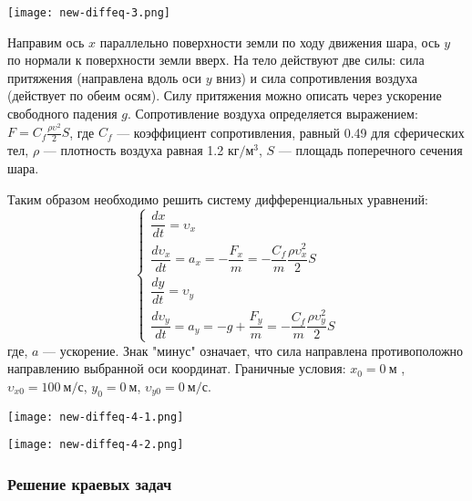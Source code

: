 \begin{center}
	\texttt{[image: new-diffeq-3.png]}
\end{center}



Направим ось $x$ параллельно поверхности земли по ходу движения шара, ось $y$ по нормали к поверхности земли вверх. На тело действуют две силы: сила притяжения (направлена вдоль оси $y$ вниз) и сила сопротивления воздуха (действует по обеим осям). Силу притяжения можно описать через ускорение свободного падения $g$. Сопротивление воздуха определяется выражением: $F=C_f \frac{\rho \upsilon^2}{2} S$, где $C_f$ --- коэффициент сопротивления, равный 0.49 для сферических тел, $\rho$ --- плотность воздуха равная 1.2 $кг/м^3$, $S$ --- площадь поперечного сечения шара.

Таким образом необходимо решить систему дифференциальных уравнений:
\begin{equation*}
\begin{cases}
\dfrac{dx}{dt}=\upsilon_x  \\
\dfrac{d \upsilon_x}{dt} = a_x = -\dfrac{F_x}{m}=-\dfrac{C_f}{m} \dfrac{\rho \upsilon_x^2}{2}S \\
\dfrac{dy}{dt}=\upsilon_y  \\
\dfrac{d \upsilon_y}{dt} = a_y = -g+\dfrac{F_y}{m}=-\dfrac{C_f}{m} \dfrac{\rho \upsilon_y^2}{2}S
\end{cases}
\end{equation*}
где, $a$ --- ускорение. Знак "минус" означает, что сила направлена противоположно направлению выбранной оси координат. Граничные условия: $x_0=0~м$ , $\upsilon_{x0}=100~м/с$, $y_0=0~ м$, $\upsilon_{y0}=0~ м/с$.

\begin{center}
	\texttt{[image: new-diffeq-4-1.png]}
\end{center}
\begin{center}
	\texttt{[image: new-diffeq-4-2.png]}
\end{center}
\subsubsection*{Решение краевых задач}

